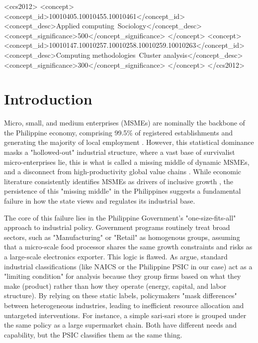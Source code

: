 \documentclass[acmtog, nonacm]{acmart}
\begin{document}
\begin{CCSXML}
<ccs2012>
 <concept>
  <concept_id>10010405.10010455.10010461</concept_id>
  <concept_desc>Applied computing~Sociology</concept_desc>
  <concept_significance>500</concept_significance>
 </concept>
 <concept>
  <concept_id>10010147.10010257.10010258.10010259.10010263</concept_id>
  <concept_desc>Computing methodologies~Cluster analysis</concept_desc>
  <concept_significance>300</concept_significance>
 </concept>
</ccs2012>
\end{CCSXML}




\maketitle
\thispagestyle{empty}
\pagestyle{plain}

\section{Introduction}

Micro, small, and medium enterprises (MSMEs) are nominally the backbone of the Philippine economy, comprising 99.5\% of registered establishments and generating the majority of local employment \citep{dti2023, psa2023}. However, this statistical dominance masks a "hollowed-out" industrial structure, where a vast base of survivalist micro-enterprises lie, this is what is called a missing middle of dynamic MSMEs, and a disconnect from high-productivity global value chains \citep{worldbank2020}. While economic literature consistently identifies MSMEs as drivers of inclusive growth \citep{llanto2017}, the persistence of this "missing middle" in the Philippines suggests a fundamental failure in how the state views and regulates its industrial base.

The core of this failure lies in the Philippine Government's "one-size-fits-all" approach to industrial policy. Government programs routinely treat broad sectors, such as "Manufacturing" or "Retail" as homogenous groups, assuming that a micro-scale food processor shares the same growth constraints and risks as a large-scale electronics exporter. This logic is flawed. As \citet{wachs2022} argue, standard industrial classifications (like NAICS or the Philippine PSIC in our case) act as a "limiting condition" for analysis because they group firms based on what they make (product) rather than how they operate (energy, capital, and labor structure). By relying on these static labels, policymakers "mask differences" between heterogeneous industries, leading to inefficient resource allocation and untargeted interventions. For instance, a simple sari-sari store is grouped under the same policy as a large supermarket chain. Both have different needs and capability, but the PSIC classifies them as the same thing.
\end{document}
